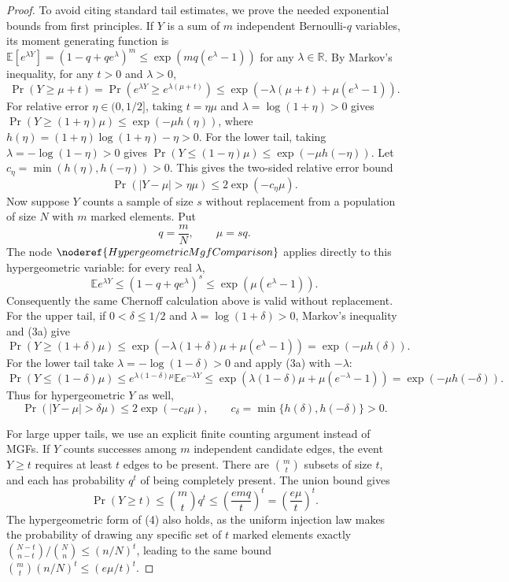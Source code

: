 \begin{proof}
To avoid citing standard tail estimates, we prove the needed exponential bounds from first principles. If \(Y\) is a sum of \(m\) independent Bernoulli-\(q\) variables, its moment generating function is \(\mathbb E[e^{\lambda Y}] = (1-q+q e^\lambda)^m \le \exp(mq(e^\lambda-1))\) for any \(\lambda \in \mathbb R\). By Markov's inequality, for any \(t > 0\) and \(\lambda > 0\),
\[
\Pr(Y \ge \mu + t) = \Pr(e^{\lambda Y} \ge e^{\lambda(\mu+t)}) \le \exp(-\lambda(\mu+t) + \mu(e^\lambda-1)).
\]
For relative error \(\eta \in (0, 1/2]\), taking \(t = \eta\mu\) and \(\lambda = \log(1+\eta) > 0\) gives \(\Pr(Y \ge (1+\eta)\mu) \le \exp(-\mu h(\eta))\), where \(h(\eta) = (1+\eta)\log(1+\eta) - \eta > 0\). For the lower tail, taking \(\lambda = -\log(1-\eta) > 0\) gives \(\Pr(Y \le (1-\eta)\mu) \le \exp(-\mu h(-\eta))\). Let \(c_\eta = \min(h(\eta), h(-\eta)) > 0\). This gives the two-sided relative error bound
\[
\Pr(|Y-\mu| > \eta\mu) \le 2\exp(-c_\eta \mu). \tag{3}
\]
Now suppose \(Y\) counts a sample of size \(s\) without replacement from a
population of size \(N\) with \(m\) marked elements.  Put
\[
q=\frac{m}{N},\qquad \mu=sq.
\]
The node \(\noderef{HypergeometricMgfComparison}\) applies directly to this
hypergeometric variable: for every real \(\lambda\),
\[
\mathbb E e^{\lambda Y}
\le (1-q+qe^\lambda)^s
\le \exp(\mu(e^\lambda-1)).
\tag{3a}
\]
Consequently the same Chernoff calculation above is valid without
replacement.  For the upper tail, if \(0<\delta\le1/2\) and
\(\lambda=\log(1+\delta)>0\), Markov's inequality and (3a) give
\[
\Pr(Y\ge(1+\delta)\mu)
\le
\exp\!\left(-\lambda(1+\delta)\mu+\mu(e^\lambda-1)\right)
=\exp(-\mu h(\delta)).
\]
For the lower tail take \(\lambda=-\log(1-\delta)>0\) and apply (3a) with
\(-\lambda\):
\[
\Pr(Y\le(1-\delta)\mu)
\le e^{\lambda(1-\delta)\mu}\mathbb E e^{-\lambda Y}
\le
\exp\!\left(\lambda(1-\delta)\mu+\mu(e^{-\lambda}-1)\right)
=\exp(-\mu h(-\delta)).
\]
Thus for hypergeometric \(Y\) as well,
\[
\Pr(|Y-\mu|>\delta\mu)
\le 2\exp(-c_\delta\mu),
\qquad
c_\delta=\min\{h(\delta),h(-\delta)\}>0 .
\tag{3H}
\]

For large upper tails, we use an explicit finite counting argument instead of MGFs. If \(Y\) counts successes among \(m\) independent candidate edges, the event \(Y \ge t\) requires at least \(t\) edges to be present. There are \(\binom{m}{t}\) subsets of size \(t\), and each has probability \(q^t\) of being completely present. The union bound gives
\[
\Pr(Y \ge t) \le \binom{m}{t} q^t \le \left(\frac{emq}{t}\right)^t = \left(\frac{e\mu}{t}\right)^t . \tag{4}
\]
The hypergeometric form of (4) also holds, as the uniform injection law makes the probability of drawing any specific set of \(t\) marked elements exactly \(\binom{N-t}{n-t} / \binom{N}{n} \le (n/N)^t\), leading to the same bound \(\binom{m}{t}(n/N)^t \le (e\mu/t)^t\).


\end{proof}
